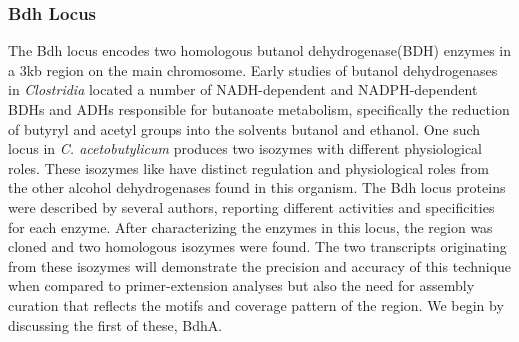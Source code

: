 \subsubsection{Bdh Locus}
The Bdh locus encodes two homologous butanol dehydrogenase(BDH) enzymes in a 3kb region on the main chromosome. Early studies of butanol dehydrogenases in \textit{Clostridia} located a number of NADH-dependent and NADPH-dependent BDHs and ADHs responsible for butanoate metabolism\cite{70,71,72,73}, specifically the reduction of butyryl and acetyl groups into the solvents butanol and ethanol. One such locus in \textit{C. acetobutylicum} produces two isozymes with different physiological roles. These isozymes like have distinct regulation and physiological roles from the other alcohol dehydrogenases found in this organism. The Bdh locus proteins were described by several authors, reporting different activities and specificities for each enzyme\cite{70,71}. After characterizing the enzymes in this locus, the region was cloned and two homologous isozymes were found. The two transcripts originating from these isozymes will demonstrate the precision and accuracy of this technique when compared to primer-extension analyses but also the need for assembly curation that reflects the motifs and coverage pattern of the region. We begin by discussing the first of these, BdhA.
